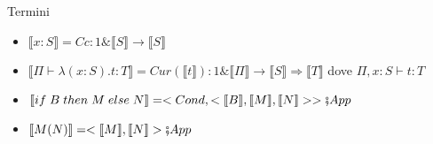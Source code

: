 \documentclass{beamer}
\begin{document}
\begin{frame}
	
	\begin{block}{Termini}
		\begin{itemize}
			\item $\llbracket x:S \rrbracket = Cc:1\& \llbracket S \rrbracket \rightarrow \llbracket S \rrbracket$
			\item $\llbracket \Pi \vdash \lambda (x : S) . t : T \rrbracket = Cur(\llbracket t \rrbracket) : 1\& \llbracket \Pi \rrbracket \rightarrow \llbracket S \rrbracket \Rightarrow \llbracket T \rrbracket$ dove $ \Pi, x:S \vdash t  : T$
			\item $\llbracket if \; B \; then \; M \; else \; N \rrbracket = <Cond, < \llbracket B \rrbracket , \llbracket M \rrbracket , \llbracket N \rrbracket > > \fatsemi App$
			\item $\llbracket M(N) \rrbracket = < \llbracket M \rrbracket , \llbracket N \rrbracket > \fatsemi App$
		\end{itemize}
		
	\end{block}

	
\end{frame}
\end{document}
